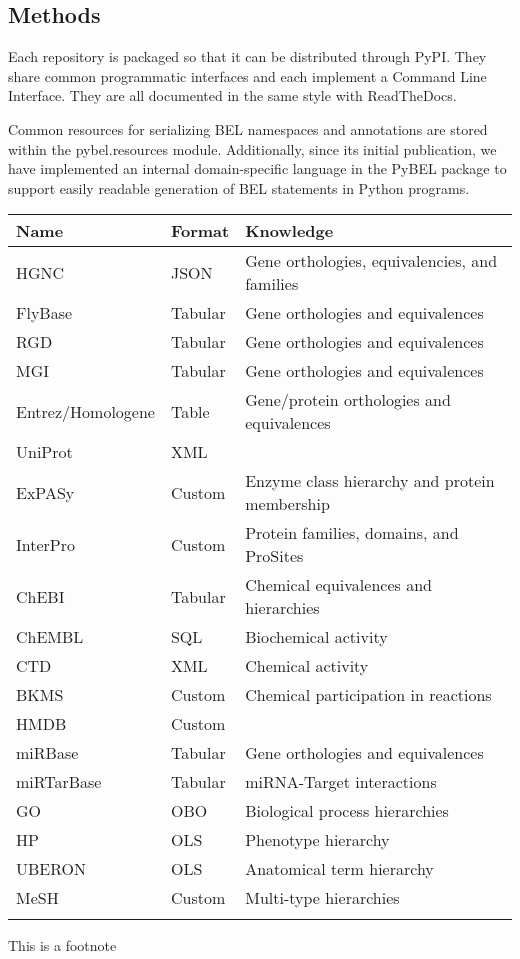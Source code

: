 \documentclass{bioinfo}
\begin{document}
\begin{methods}
\section{Methods}

Each repository is packaged so that it can be distributed through PyPI. They share common programmatic interfaces and each implement a Command Line Interface. They are all documented in the same style with ReadTheDocs.

Common resources for serializing BEL namespaces and annotations are stored within the pybel.resources module. Additionally, since its initial publication, we have implemented an internal domain-specific language in the PyBEL package to support easily readable generation of BEL statements in Python programs.

\begin{table}[!t]
 {\begin{tabular}{@{}lll@{}}\toprule
Name & Format & Knowledge\\\midrule
HGNC & JSON & Gene orthologies, equivalencies, and families\\
FlyBase & Tabular & Gene orthologies and equivalences\\
RGD & Tabular & Gene orthologies and equivalences\\
MGI & Tabular & Gene orthologies and equivalences\\
Entrez/Homologene & Table & Gene/protein orthologies and equivalences\\
UniProt & XML & \\
ExPASy & Custom & Enzyme class hierarchy and protein membership\\
InterPro & Custom & Protein families, domains, and ProSites\\
ChEBI & Tabular & Chemical equivalences and hierarchies\\
ChEMBL & SQL & Biochemical activity\\
CTD & XML & Chemical activity\\
BKMS & Custom & Chemical participation in reactions\\
HMDB & Custom & \\
miRBase & Tabular & Gene orthologies and equivalences\\
miRTarBase & Tabular & miRNA-Target interactions\\
GO & OBO & Biological process hierarchies\\
HP & OLS & Phenotype hierarchy\\
UBERON & OLS & Anatomical term hierarchy\\
MeSH & Custom & Multi-type hierarchies\\\botrule
\end{tabular}}{This is a footnote}
\end{table}

\end{methods}
\end{document}
